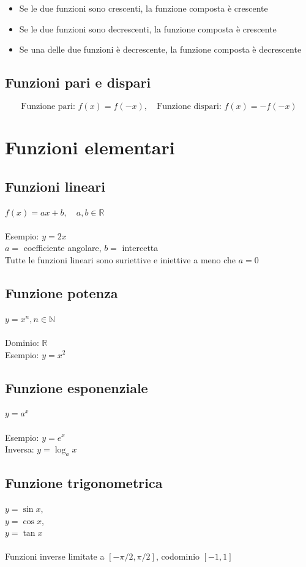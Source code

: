 \documentclass[12pt,a4paper]{article}
\let\oldsection\section
\renewcommand{\section}{\clearpage\oldsection}
\begin{document}
\begin{itemize}
\item Se le due funzioni sono crescenti, la funzione composta è crescente
\item Se le due funzioni sono decrescenti, la funzione composta è crescente
\item Se una delle due funzioni è decrescente, la funzione composta è decrescente
\end{itemize}

\subsection{Funzioni pari e dispari}

\[
\text{Funzione pari: } f(x)=f(-x), \quad \text{Funzione dispari: } f(x)=-f(-x)
\]

\section{Funzioni elementari}

\subsection{Funzioni lineari}
$f(x)=ax+b, \quad a,b \in \mathbb{R}$\\\\
Esempio: $y=2x$  \\
$a = $ coefficiente angolare, $b = $ intercetta\\
Tutte le funzioni lineari sono suriettive e iniettive a meno che $a=0$

\subsection{Funzione potenza}
$y=x^n, n\in \mathbb{N}$  \\\\
Dominio: $\mathbb{R}$ \\ 
Esempio: $y=x^2$

\subsection{Funzione esponenziale}
$y=a^x$ \\\\ 
Esempio: $y=e^x$  \\
Inversa: $y=\log_a x$

\subsection{Funzione trigonometrica}
$y=\sin x$, \\$y=\cos x$, \\$y=\tan x$\\\\  
Funzioni inverse limitate a $[-\pi/2,\pi/2]$, codominio $[-1,1]$  
\end{document}
